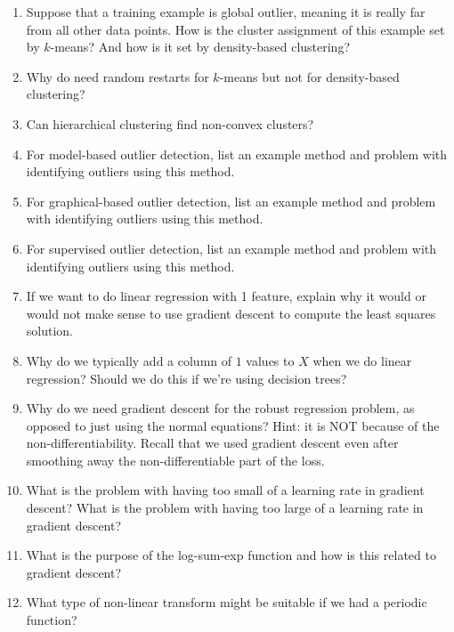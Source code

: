 \documentclass{article}
\begin{document}
\begin{enumerate}
\item Suppose that a training example is global outlier, meaning it is really far from all other data points. How is the cluster assignment of this example set by $k$-means? And how is it set by density-based clustering?

\item Why do need random restarts for $k$-means but not for density-based clustering?

\item Can hierarchical clustering find non-convex clusters?

\item For model-based outlier detection, list an example method and problem with identifying outliers using this method.

\item For graphical-based outlier detection, list an example method and problem with identifying outliers using this method.

\item For supervised outlier detection, list an example method and problem with identifying outliers using this method.

\item If we want to do linear regression with 1 feature, explain why it would or would not make sense to use gradient descent to compute the least squares solution.

\item Why do we typically add a column of $1$ values to $X$ when we do linear regression? Should we do this if we're using decision trees?

\item Why do we need gradient descent for the robust regression problem, as opposed to just using the normal equations? Hint: it is NOT because of the non-differentiability. Recall that we used gradient descent even after smoothing away the non-differentiable part of the loss.

\item What is the problem with having too small of a learning rate in gradient descent? What is the problem with having too large of a learning rate in gradient descent?

\item What is the purpose of the log-sum-exp function and how is this related to gradient descent?

\item What type of non-linear transform might be suitable if we had a periodic function?
\end{enumerate}
\end{document}
